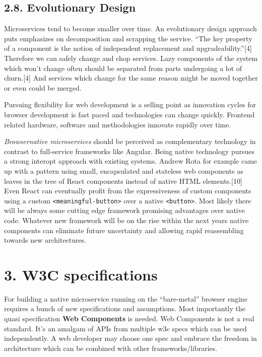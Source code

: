\documentclass[]{article}
\begin{document}
\subsection{2.8. Evolutionary Design}\label{evolutionary-design}

Microservices tend to become smaller over time. An evolutionary design
approach puts emphasizes on decomposition and scrapping the service.
``The key property of a component is the notion of independent
replacement and upgradeability.''{[}4{]} Therefore we can safely change
and chop services. Lazy components of the system which won't change
often should be separated from parts undergoing a lot of churn.{[}4{]}
And services which change for the same reason might be moved together or
even could be merged.

Pursuing flexibility for web development is a selling point as
innovation cycles for browser development is fast paced and technologies
can change quickly. Frontend related hardware, software and
methodologies innovate rapidly over time.

\emph{Browsernative microservices} should be perceived as complementary
technology in contrast to full-service frameworks like Angular. Being
native technology pursues a strong interopt approach with existing
systems. Andrew Rota for example came up with a pattern using small,
encapsulated and stateless web components as leaves in the tree of React
components instead of native HTML elements.{[}10{]} Even React can
eventually profit from the expressiveness of custom components using a
custom \texttt{\textless{}meaningful-button\textgreater{}} over a native
\texttt{\textless{}button\textgreater{}}. Most likely there will be
always some cutting edge framework promising advantages over native
code. Whatever new framework will be on the rise within the next years
native components can eliminate future uncertainty and allowing rapid
reassembling towards new architectures.

\section{3. W3C specifications}\label{w3c-specifications}

For building a native microservice running on the ``bare-metal'' browser
engine requires a bunch of new specifications and assumptions. Most
importantly the quasi specification \textbf{Web Components} is needed.
Web Components is not a real standard. It's an amalgam of APIs from
multiple w3c specs which can be used independently. A web developer may
choose one spec and embrace the freedom in architecture which can be
combined with other frameworks/libraries.
\end{document}
